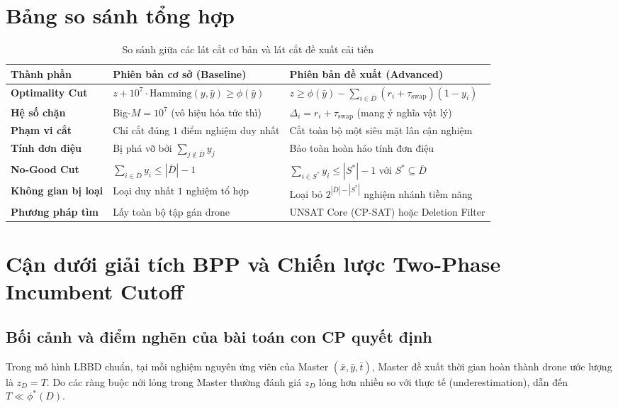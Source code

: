\documentclass[12pt,a4paper]{article}
\newcommand{\swap}{\tau_{\mathrm{swap}}}
\begin{document}
\section{Bảng so sánh tổng hợp}
\label{sec:comparison}

\begin{table}[H]
\centering
\small
\renewcommand{\arraystretch}{1.3}
\caption{So sánh giữa các lát cắt cơ bản và lát cắt đề xuất cải tiến}
\label{tab:comparison}
\begin{tabular}{p{3.2cm} p{5.5cm} p{6.8cm}}
\toprule
\textbf{Thành phần} & \textbf{Phiên bản cơ sở (Baseline)} & \textbf{Phiên bản đề xuất (Advanced)} \\
\midrule
\textbf{Optimality Cut} & $z + 10^7 \cdot \text{Hamming}(y, \bar{y}) \ge \phi(\bar{y})$ & $z \ge \phi(\bar{y}) - \sum_{i \in \bar{D}} (r_i + \swap)(1 - y_i)$ \\
\textbf{Hệ số chặn} & Big-$M = 10^7$ (vô hiệu hóa tức thì) & $\Delta_i = r_i + \swap$ (mang ý nghĩa vật lý) \\
\textbf{Phạm vi cắt} & Chỉ cắt đúng $1$ điểm nghiệm duy nhất & Cắt toàn bộ một siêu mặt lân cận nghiệm \\
\textbf{Tính đơn điệu} & Bị phá vỡ bởi $\sum_{j \notin \bar{D}} y_j$ & Bảo toàn hoàn hảo tính đơn điệu \\
\midrule
\textbf{No-Good Cut} & $\sum_{i \in \bar{D}} y_i \le |\bar{D}| - 1$ & $\sum_{i \in S^*} y_i \le |S^*| - 1$ với $S^* \subseteq \bar{D}$ \\
\textbf{Không gian bị loại} & Loại duy nhất $1$ nghiệm tổ hợp & Loại bỏ $2^{|\bar{D}| - |S^*|}$ nghiệm nhánh tiềm năng \\
\textbf{Phương pháp tìm} & Lấy toàn bộ tập gán drone & UNSAT Core (CP-SAT) hoặc Deletion Filter \\
\bottomrule
\end{tabular}
\end{table}

\section{Cận dưới giải tích BPP và Chiến lược Two-Phase Incumbent Cutoff}
\label{sec:analytical-bpp-and-cutoff}

\subsection{Bối cảnh và điểm nghẽn của bài toán con CP quyết định}
Trong mô hình LBBD chuẩn, tại mỗi nghiệm nguyên ứng viên của Master $(\bar{x}, \bar{y}, \bar{t})$, Master đề xuất thời gian hoàn thành drone ước lượng là $z_D = T$. Do các ràng buộc nới lỏng trong Master thường đánh giá $z_D$ lỏng hơn nhiều so với thực tế (underestimation), dẫn đến $T \ll \phi^*(D)$. 
\end{document}
